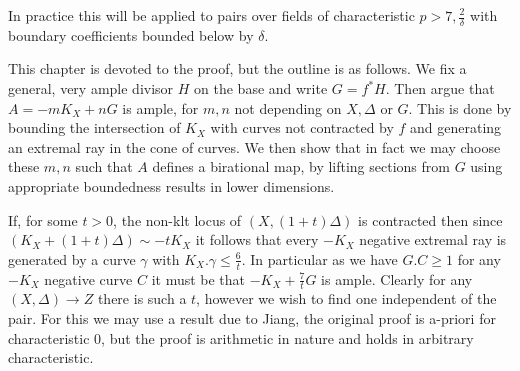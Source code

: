 \documentclass[a4paper,12pt]{book}
\begin{document}
\begin{remark}
	In practice this will be applied to pairs over fields of characteristic $p > 7,\frac{2}{\delta}$ with boundary coefficients bounded below by $\delta$.
\end{remark}

This chapter is devoted to the proof, but the outline is as follows. We fix a general, very ample divisor $H$ on the base and write $G=f^{*}H$. Then argue that $A=-mK_{X}+nG$ is ample, for $m,n$ not depending on $X,\Delta$ or $G$. This is done by bounding the intersection of $K_{X}$ with curves not contracted by $f$ and generating an extremal ray in the cone of curves. We then show that in fact we may choose these $m,n$ such that $A$ defines a birational map, by lifting sections from $G$ using appropriate boundedness results in lower dimensions. 

If, for some $t>0$, the non-klt locus of $(X,(1+t)\Delta)$ is contracted then since $(K_{X}+(1+t)\Delta) \sim -tK_{X}$ it follows that every $-K_{X}$ negative extremal ray is generated by a curve $\gamma$ with $K_{X}.\gamma \leq \frac{6}{t}$. In particular as we have $G.C \geq 1$ for any $-K_{X}$ negative curve $C$ it must be that $-K_{X}+\frac{7}{t}G$ is ample. Clearly for any $(X,\Delta) \to Z$ there is such a $t$, however we wish to find one independent of the pair. For this we may use a result due to Jiang, the original proof is a-priori for characteristic $0$, but the proof is arithmetic in nature and holds in arbitrary characteristic.
\end{document}
